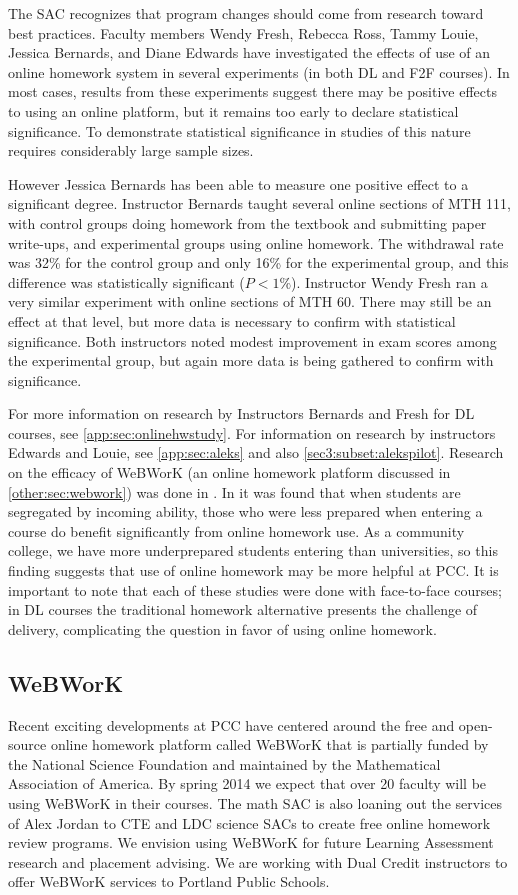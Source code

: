 The SAC recognizes that program changes should come from research toward best
practices.  Faculty members Wendy Fresh, Rebecca Ross, Tammy Louie, Jessica
Bernards, and Diane Edwards have investigated the effects of use of an online
homework system in several experiments (in both DL and F2F courses). In most
cases, results from these experiments suggest there may be positive effects to
using an online platform, but it remains too early to declare statistical
significance. To demonstrate statistical significance in studies of this nature
requires considerably large sample sizes. 

However Jessica Bernards has been able to measure one positive effect to a
significant degree. Instructor Bernards taught several online sections of MTH
111, with control groups doing homework from the textbook and submitting paper
write-ups, and experimental groups using online homework. The withdrawal rate
was 32\% for the control group and only 16\% for the experimental group, and
this difference was statistically significant ($P<1\%$).  Instructor Wendy Fresh
ran a very similar experiment with online sections of MTH 60. There may still be
an effect at that level, but more data is necessary to confirm with statistical
significance. Both instructors noted modest improvement in exam scores among the
experimental group, but again more data is being gathered to confirm with
significance.

For more information on research by Instructors Bernards and Fresh for DL
courses, see \vref{app:sec:onlinehwstudy}. For information on research by
instructors Edwards and Louie, see \vref{app:sec:aleks} and also
\cref{sec3:subset:alekspilot}. Research on the efficacy of WeBWorK (an online
homework platform discussed in \vref{other:sec:webwork}) was done in
\cite{focuswebwork}.  In \cite{brewer} it was found that when students are
segregated by incoming ability, those who were less prepared when entering a
course do benefit significantly from online homework use. As a community
college, we have more underprepared students entering than universities, so this
finding suggests that use of online homework may be more helpful at PCC. It is
important to note that each of these studies were done with face-to-face
courses; in DL courses the traditional homework alternative presents the
challenge of delivery, complicating the question in favor of using online
homework.

\subsection{WeBWorK}\label{other:sec:webwork}
Recent exciting developments at PCC have centered around the free and
open-source online homework platform called WeBWorK that is partially funded by
the National Science Foundation and maintained by the Mathematical Association
of America. By spring 2014 we expect that over 20 faculty will be using WeBWorK
in their courses. The math SAC is also loaning out the services of Alex Jordan
to CTE and LDC science SACs to create free online homework review programs. We
envision using WeBWorK for future Learning Assessment research and placement
advising. We are working with Dual Credit instructors to offer WeBWorK services
to Portland Public Schools.

